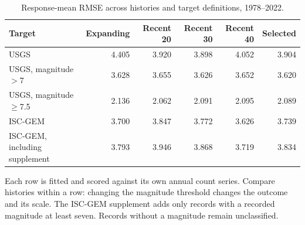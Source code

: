 \begin{table}[!htb]
\centering
\small
\caption{Response-mean RMSE across histories and target definitions, 1978--2022.}
\label{tab:sensitivity}
\setlength{\tabcolsep}{4pt}
\begin{tabular}{lrrrrr}
\toprule
Target & Expanding & Recent 20 & Recent 30 & Recent 40 & Selected \\
\midrule
USGS & 4.405 & 3.920 & 3.898 & 4.052 & 3.904 \\
USGS, magnitude $>7$ & 3.628 & 3.655 & 3.626 & 3.652 & 3.620 \\
USGS, magnitude $\geq$7.5 & 2.136 & 2.062 & 2.091 & 2.095 & 2.089 \\
ISC-GEM & 3.700 & 3.847 & 3.772 & 3.626 & 3.739 \\
ISC-GEM, including supplement & 3.793 & 3.946 & 3.868 & 3.719 & 3.834 \\
\bottomrule
\end{tabular}
\par\smallskip
\begin{minipage}{\linewidth}\footnotesize
Each row is fitted and scored against its own annual count series. Compare histories within a row: changing the magnitude threshold changes the outcome and its scale. The ISC-GEM supplement adds only records with a recorded magnitude at least seven. Records without a magnitude remain unclassified.
\end{minipage}
\end{table}
